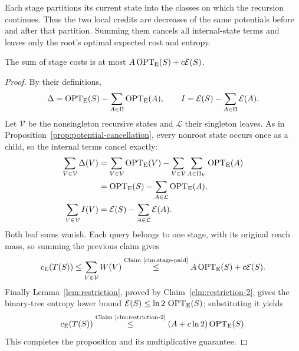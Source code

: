 Each stage partitions its current state into the classes on which
the recursion continues. Thus the two local credits are decreases
of the same potentials before and after that partition. Summing
them cancels all internal-state terms and leaves only the root's
optimal expected cost and entropy.
\begin{claim}
\label{clm:stage-telescoping}
The sum of stage costs is at most
$A\operatorname{OPT}_{\mathrm E}(S)+c\mathcal E(S)$.
\end{claim}
\begin{proof}
By their definitions,
\[
 \Delta=\operatorname{OPT}_{\mathrm E}(S)-\sum_{A\in\Pi}\operatorname{OPT}_{\mathrm E}(A),
 \qquad I=\mathcal E(S)-\sum_{A\in\Pi}\mathcal E(A).
\]
Let $\mathcal V$ be the nonsingleton recursive states and
$\mathcal L$ their singleton leaves. As in
Proposition~\ref{prop:potential-cancellation}, every nonroot state occurs
once as a child, so the internal terms cancel exactly:
\[
 \begin{aligned}
 \sum_{V\in\mathcal V}\Delta(V)
 &=\sum_{V\in\mathcal V}\operatorname{OPT}_{\mathrm E}(V)
   -\sum_{V\in\mathcal V}\sum_{A\in\Pi_V}\operatorname{OPT}_{\mathrm E}(A)\\
 &=\operatorname{OPT}_{\mathrm E}(S)-\sum_{A\in\mathcal L}\operatorname{OPT}_{\mathrm E}(A),\\
 \sum_{V\in\mathcal V}I(V)
 &=\mathcal E(S)-\sum_{A\in\mathcal L}\mathcal E(A).
 \end{aligned}
\]
Both leaf sums vanish. Each query belongs to one stage, with its
original reach mass, so summing the previous claim gives
\[
 c_{\mathrm E}(T(S))\le\sum_{V\in\mathcal V}W(V)
 \byref{Claim}{clm:stage-paid}{\le} A\OPT_{\mathrm E}(S)+c\mathcal E(S).
\]
Finally Lemma~\ref{lem:restriction}, proved by
Claim~\ref{clm:restriction-2}, gives the binary-tree entropy lower bound
$\mathcal E(S)\le\ln2\,\operatorname{OPT}_{\mathrm E}(S)$; substituting it yields
\[
 c_{\mathrm E}(T(S))
 \byref{Claim}{clm:restriction-2}{\le}(A+c\ln2)\OPT_{\mathrm E}(S).
\]
This completes the proposition and its multiplicative guarantee.
\end{proof}
